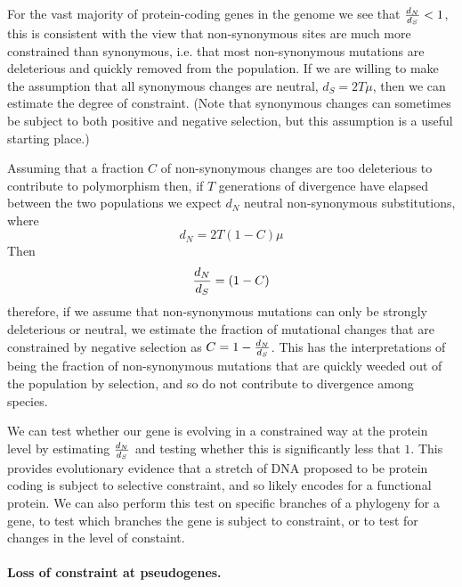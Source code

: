 For the vast majority of protein-coding genes in the genome we see that $\frac{d_N}{d_S} < 1$, this is consistent with the view
that non-synonymous sites are much more constrained than synonymous, i.e. that most non-synonymous mutations are deleterious and quickly
removed from the population. If we are willing to make the assumption that all synonymous changes are
neutral, $d_S=2T \mu$, then we can estimate the degree of constraint. (Note that synonymous changes can sometimes be subject to
both positive and negative selection, but this assumption is a useful starting place.) 

Assuming that a fraction $C$ of non-synonymous changes are too
deleterious to contribute to polymorphism then, if $T$ generations of divergence have
elapsed between the two populations we expect $d_N$ neutral non-synonymous substitutions, where
\begin{equation}
d_N = 2T (1-C) \mu  
\end{equation}
Then
\begin{equation} 
\frac{d_N}{d_S} = (1-C) 
\end{equation}
therefore, if we assume that non-synonymous mutations can only be
strongly deleterious or neutral, we estimate the fraction of mutational changes that
are constrained by negative selection as $C= 1- \frac{d_N}{d_S}$. This has the
interpretations of being the fraction of non-synonymous mutations that are quickly weeded out of the population by selection, and so do not contribute to divergence among species. 

We can test whether our gene is evolving in a constrained way at the protein level by estimating $\frac{d_N}{d_S}$ and testing whether this is significantly less that  $1$. This provides evolutionary evidence that a stretch of DNA proposed to be protein coding is subject to selective constraint, and so likely encodes for a functional protein. We can also perform this test on specific branches of a phylogeny for a gene, to test which branches the gene is subject to constraint, or to test for changes in the level of constaint. 

\paragraph{Loss of constraint at pseudogenes.}



